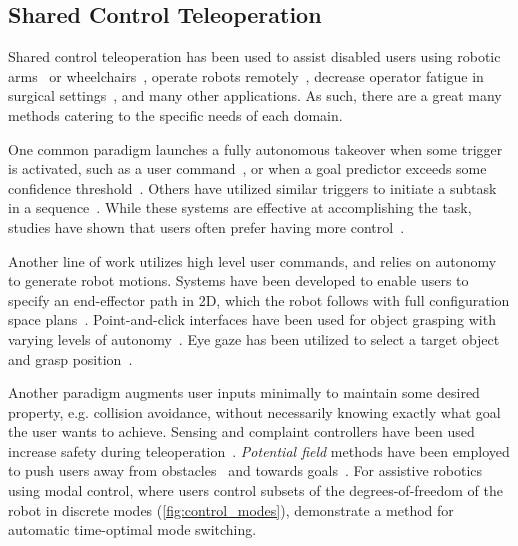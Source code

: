 \subsection{Shared Control Teleoperation}
\label{sec:related_shared_teleop}


\graphicspath{{./}{./images/}{./images_hri_2016/}}

Shared control teleoperation has been used to assist disabled users using robotic arms~\citep{kim_2006_bci, kim_2012, mcmullen_2014, katyal_2014, schroeer_2015, muelling_2015} or wheelchairs~\citep{argall_2016,carlson_2012}, operate robots remotely~\citep{shen_2004, you_2011, leeper_2012}, decrease operator fatigue in surgical settings~\citep{park_2001, marayong_2003, kragic_2005, aarno_2005_virtualfixtures, li_2007}, and many other applications. As such, there are a great many methods catering to the specific needs of each domain.

One common paradigm launches a fully autonomous takeover when some trigger is activated, such as a user command~\citep{shen_2004, bien_2004, simpson_2005, kim_2012}, or when a goal predictor exceeds some confidence threshold~\citep{fagg_2004, kofman_2005, mcmullen_2014, katyal_2014}. Others have utilized similar triggers to initiate a subtask in a sequence~\citep{schroeer_2015, jain_argall_2015}. While these systems are effective at accomplishing the task, studies have shown that users often prefer having more control~\citep{kim_2012}.

Another line of work utilizes high level user commands, and relies on autonomy to generate robot motions. Systems have been developed to enable users to specify an end-effector path in 2D, which the robot follows with full configuration space plans~\citep{you_2011, hauser_2013}. Point-and-click interfaces have been used for object grasping with varying levels of autonomy~\citep{leeper_2012}. Eye gaze has been utilized to select a target object and grasp position~\citep{bien_2004}.

Another paradigm augments user inputs minimally to maintain some desired property, e.g. collision avoidance, without necessarily knowing exactly what goal the user wants to achieve. Sensing and complaint controllers have been used increase safety during teleoperation~\citep{kim_2006_bci, vogel_2014}. \emph{Potential field} methods have been employed to push users away from obstacles~\citep{crandall_2002} and towards goals~\citep{aigner_1997}. For assistive robotics using modal control, where users control subsets of the degrees-of-freedom of the robot in discrete modes (\cref{fig:control_modes}), \citet{herlant_2016} demonstrate a method for automatic time-optimal mode switching.

